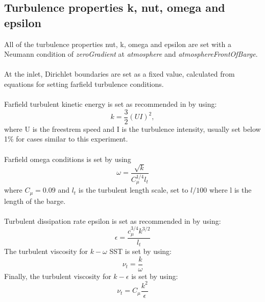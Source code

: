 \documentclass[a4paper, 12pt]{report}
\begin{document}
\subsection{Turbulence properties k, nut, omega and epsilon}
All of the turbulence properties nut, k, omega and epsilon are set with a Neumann condition of \textit{zeroGradient} at \textit{atmosphere} and \textit{atmosphereFrontOfBarge}.\\
\\
At the inlet, Dirichlet boundaries are set as a fixed value, calculated from equations for setting farfield turbulence conditions.\\
\\
Farfield turbulent kinetic energy is set as recommended in \cite{practicalShip}by using:
\begin{equation}
k = \frac{3}{2}(UI)^2,
\label{eqn:turbulentKineticEnergy}
\end{equation}
where U is the freestrem speed and I is the turbulence intensity, usually set below 1\% for cases similar to this experiment. \\
\\
Farfield omega conditions is set by using \cite{turbulenceFreeStream}
\begin{equation}
\omega = \frac{\sqrt{k}}{C_{\mu}^{1/4}l_t}
\label{eqn:turbulentOmega}
\end{equation}
where $C_{\mu}=0.09$ and $l_t$ is the turbulent length scale, set to $l/100$ where l is the length of the barge.\\
\\
Turbulent dissipation rate epsilon is set as recommended in \cite{practicalShip} by using:
\begin{equation}
\epsilon =  \frac{c_{\mu}^{3/4} k^{3/2}}{l_t}
\label{eqn:turbulentDissipationRate}
\end{equation}
The turbulent viscosity for $k-\omega$ SST is set by using:
\begin{equation}
\nu_t = \frac{k}{\omega}
\label{eqn:turbulentViscosityFarfield}
\end{equation}
Finally, the turbulent viscosity for $k-\epsilon$ is set by using:
\begin{equation}
\nu_t = C_{\mu}\frac{k^2}{\epsilon}
\label{eqn:turbulentViscosityFarfield}
\end{equation}
\end{document}
